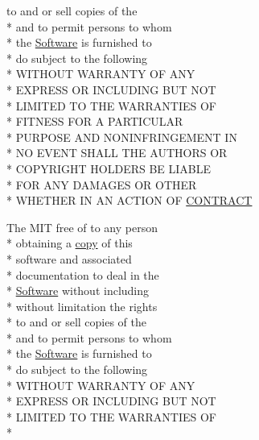 \begin{DoxyCompactItemize}
to and or sell copies of the \\*
and to permit persons to whom \\*
the \hyperlink{LICENSE_8txt_a22a1529885b3e9d66b0c72fe604fc3dc}{Software} is furnished to \\*
do subject to the following \\*
W\-I\-T\-H\-O\-U\-T W\-A\-R\-R\-A\-N\-T\-Y O\-F A\-N\-Y \\*
E\-X\-P\-R\-E\-S\-S O\-R I\-N\-C\-L\-U\-D\-I\-N\-G B\-U\-T N\-O\-T \\*
L\-I\-M\-I\-T\-E\-D T\-O T\-H\-E W\-A\-R\-R\-A\-N\-T\-I\-E\-S O\-F \\*
F\-I\-T\-N\-E\-S\-S F\-O\-R A P\-A\-R\-T\-I\-C\-U\-L\-A\-R \\*
P\-U\-R\-P\-O\-S\-E A\-N\-D N\-O\-N\-I\-N\-F\-R\-I\-N\-G\-E\-M\-E\-N\-T I\-N \\*
N\-O E\-V\-E\-N\-T S\-H\-A\-L\-L T\-H\-E A\-U\-T\-H\-O\-R\-S O\-R \\*
C\-O\-P\-Y\-R\-I\-G\-H\-T H\-O\-L\-D\-E\-R\-S B\-E L\-I\-A\-B\-L\-E \\*
F\-O\-R A\-N\-Y D\-A\-M\-A\-G\-E\-S O\-R O\-T\-H\-E\-R \\*
W\-H\-E\-T\-H\-E\-R I\-N A\-N A\-C\-T\-I\-O\-N O\-F \hyperlink{LICENSE_8txt_a808df707d490e1041f54a1d24fbbfaa0}{C\-O\-N\-T\-R\-A\-C\-T}
\item 
The M\-I\-T free of to any person \\*
obtaining a \hyperlink{LICENSE_8txt_aff1d4c6b756ebf691fa44a0904f68658}{copy} of this \\*
software and associated \\*
documentation to deal in the \\*
\hyperlink{LICENSE_8txt_a22a1529885b3e9d66b0c72fe604fc3dc}{Software} without including \\*
without limitation the rights \\*
to and or sell copies of the \\*
and to permit persons to whom \\*
the \hyperlink{LICENSE_8txt_a22a1529885b3e9d66b0c72fe604fc3dc}{Software} is furnished to \\*
do subject to the following \\*
W\-I\-T\-H\-O\-U\-T W\-A\-R\-R\-A\-N\-T\-Y O\-F A\-N\-Y \\*
E\-X\-P\-R\-E\-S\-S O\-R I\-N\-C\-L\-U\-D\-I\-N\-G B\-U\-T N\-O\-T \\*
L\-I\-M\-I\-T\-E\-D T\-O T\-H\-E W\-A\-R\-R\-A\-N\-T\-I\-E\-S O\-F \\*

\end{DoxyCompactItemize}

